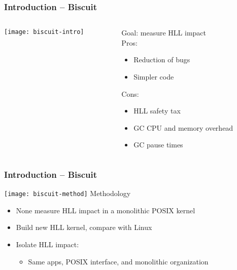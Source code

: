 \begin{frame}[plain]
	\frametitle{Introduction -- Biscuit}
	
	
	
	\begin{columns}
		
		\begin{column}{.5\textwidth}
			
			\texttt{[image: biscuit-intro]}
			
		\end{column}
		
		\begin{column}{.5\textwidth}
			
			\Large
	 	  Goal: measure HLL impact  \\
			
			\normalsize
			Pros:
			\begin{itemize}
				\item Reduction of bugs
				\item Simpler code	
			\end{itemize}
			
			Cons:
			\begin{itemize}
				\item HLL safety tax
				\item GC CPU and memory overhead				
				\item GC pause times	
			\end{itemize}
		\end{column}
		
		
	\end{columns}
	
	
\end{frame}

\begin{frame}[plain]
	\frametitle{Introduction -- Biscuit}
	
	\texttt{[image: biscuit-method]}
	Methodology
	\begin{itemize}
		\item None measure HLL impact in a monolithic POSIX kernel
		\item Build new HLL kernel, compare with Linux
		\item  Isolate HLL impact:
		\begin{itemize}
		\item Same apps, POSIX interface, and monolithic organization
		\end{itemize}
	\end{itemize}
	
	
\end{frame}


